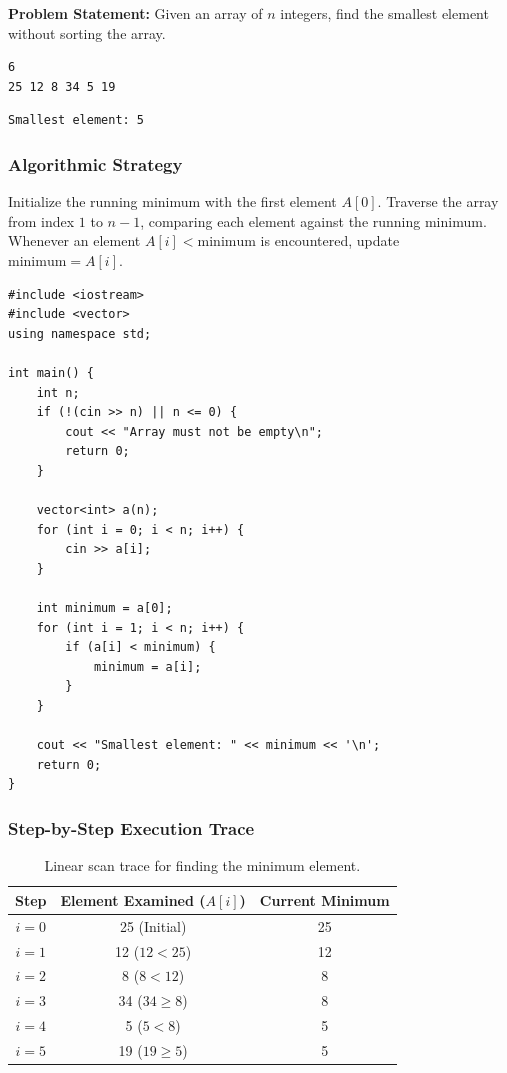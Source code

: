 \textbf{Problem Statement:} Given an array of $n$ integers, find the smallest element without sorting the array.

\begin{lstlisting}[style=pseudocode, caption={Input}]
6
25 12 8 34 5 19
\end{lstlisting}

\begin{lstlisting}[style=pseudocode, caption={Expected Output}]
Smallest element: 5
\end{lstlisting}

\subsubsection*{Algorithmic Strategy}
Initialize the running minimum with the first element $A[0]$. Traverse the array from index $1$ to $n-1$, comparing each element against the running minimum. Whenever an element $A[i] < \text{minimum}$ is encountered, update $\text{minimum} = A[i]$.

\begin{lstlisting}[style=cppstyle, caption={C++ Solution for Finding Minimum Element.}]
#include <iostream>
#include <vector>
using namespace std;

int main() {
    int n;
    if (!(cin >> n) || n <= 0) {
        cout << "Array must not be empty\n";
        return 0;
    }

    vector<int> a(n);
    for (int i = 0; i < n; i++) {
        cin >> a[i];
    }

    int minimum = a[0];
    for (int i = 1; i < n; i++) {
        if (a[i] < minimum) {
            minimum = a[i];
        }
    }

    cout << "Smallest element: " << minimum << '\n';
    return 0;
}
\end{lstlisting}

\subsubsection*{Step-by-Step Execution Trace}
\begin{table}[htbp]
\centering
\small
\begin{tabular}{c c c}
\toprule
\textbf{Step} & \textbf{Element Examined ($A[i]$)} & \textbf{Current Minimum} \\
\midrule
$i = 0$ & 25 (Initial) & 25 \\
$i = 1$ & 12 ($12 < 25$) & 12 \\
$i = 2$ & 8 ($8 < 12$) & 8 \\
$i = 3$ & 34 ($34 \geq 8$) & 8 \\
$i = 4$ & 5 ($5 < 8$) & 5 \\
$i = 5$ & 19 ($19 \geq 5$) & 5 \\
\bottomrule
\end{tabular}
\caption{Linear scan trace for finding the minimum element.}
\end{table}

